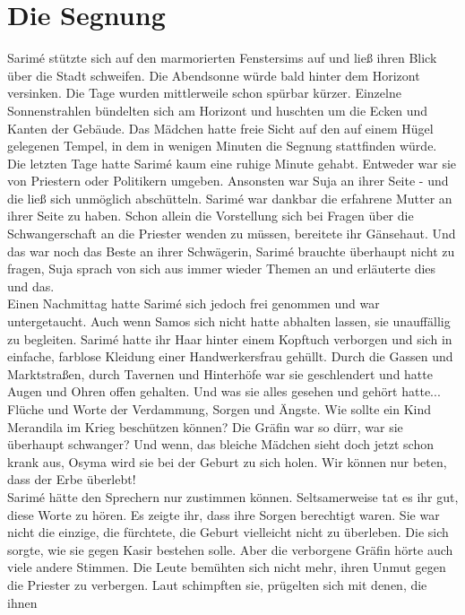 \chapter{Die Segnung}

Sarimé stützte sich auf den marmorierten Fenstersims auf und ließ ihren Blick über die Stadt 
schweifen. Die Abendsonne würde bald hinter dem Horizont versinken. Die Tage wurden mittlerweile 
schon spürbar kürzer. Einzelne Sonnenstrahlen bündelten sich am Horizont und huschten um die Ecken 
und Kanten der Gebäude. Das Mädchen hatte freie Sicht auf den auf einem Hügel gelegenen Tempel, in 
dem in wenigen Minuten die Segnung stattfinden würde.\\
Die letzten Tage hatte Sarimé kaum eine ruhige Minute gehabt. Entweder war sie von Priestern oder 
Politikern umgeben. Ansonsten war Suja an ihrer Seite - und die ließ sich unmöglich abschütteln. 
Sarimé war dankbar die erfahrene Mutter an ihrer Seite zu haben. Schon allein die Vorstellung sich 
bei Fragen über die Schwangerschaft an die Priester wenden zu müssen, bereitete ihr Gänsehaut. Und 
das war noch das Beste an ihrer Schwägerin, Sarimé brauchte überhaupt nicht zu fragen, Suja sprach 
von sich aus immer wieder Themen an und erläuterte dies und das.\\
Einen Nachmittag hatte Sarimé sich jedoch frei genommen und war untergetaucht. Auch wenn Samos sich 
nicht hatte abhalten lassen, sie unauffällig zu begleiten. Sarimé hatte ihr Haar hinter einem 
Kopftuch verborgen und sich in einfache, farblose Kleidung einer Handwerkersfrau gehüllt. Durch die 
Gassen und Marktstraßen, durch Tavernen und Hinterhöfe war sie geschlendert und hatte Augen und 
Ohren offen gehalten. Und was sie alles gesehen und gehört hatte...\\
Flüche und Worte der Verdammung, Sorgen und Ängste. Wie sollte ein Kind Merandila im Krieg 
beschützen können? Die Gräfin war so dürr, war sie überhaupt schwanger? Und wenn, das bleiche 
Mädchen sieht doch jetzt schon krank aus, Osyma wird sie bei der Geburt zu sich holen. Wir können 
nur beten, dass der Erbe überlebt!\\
Sarimé hätte den Sprechern nur zustimmen können. Seltsamerweise tat es ihr gut, diese Worte zu 
hören. Es zeigte ihr, dass ihre Sorgen berechtigt waren. Sie war nicht die einzige, die fürchtete, 
die Geburt vielleicht nicht zu überleben. Die sich sorgte, wie sie gegen Kasir bestehen solle. Aber 
die verborgene Gräfin hörte auch viele andere Stimmen. Die Leute bemühten sich nicht mehr, ihren 
Unmut gegen die Priester zu verbergen. Laut schimpften sie, prügelten sich mit denen, die ihnen 
